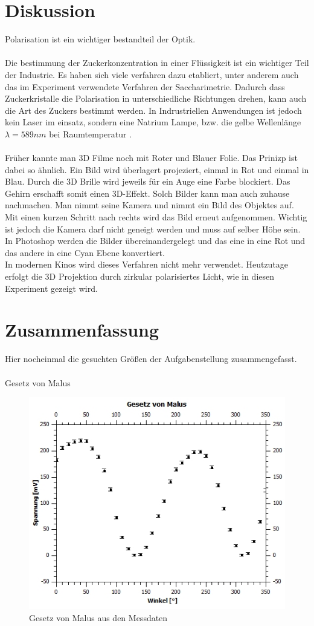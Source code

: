 \documentclass[12pt,a4paper,twoside]{article}
\begin{document}
\section{Diskussion} %
Polarisation ist ein wichtiger bestandteil der Optik. \\
\\
Die bestimmung der Zuckerkonzentration in einer Flüssigkeit ist ein wichtiger Teil der Industrie. Es haben sich viele verfahren dazu etabliert, unter anderem auch das im Experiment verwendete Verfahren der Saccharimetrie. 
Dadurch dass Zuckerkristalle die Polarisation in unterschiedliche Richtungen drehen, kann auch die Art des Zuckers bestimmt werden. 
In Indrustriellen Anwendungen ist jedoch kein Laser im einsatz, sondern eine Natrium Lampe, bzw. die gelbe Wellenlänge $\lambda = 589 nm$ bei Raumtemperatur \cite{wikisacc}. 
\\
\\
Früher kannte man 3D Filme noch mit Roter und Blauer Folie. Das Prinizp ist dabei so ähnlich. Ein Bild wird überlagert projeziert, einmal in Rot und einmal in Blau. Durch die 3D Brille wird jeweils für ein Auge eine Farbe blockiert. Das Gehirn erschafft somit einen 3D-Effekt. 
Solch Bilder kann man auch zuhause nachmachen. Man nimmt seine Kamera und nimmt ein Bild des Objektes auf. Mit einen kurzen Schritt nach rechts wird das Bild erneut aufgenommen. Wichtig ist jedoch die Kamera darf nicht geneigt werden und muss auf selber Höhe sein. 
In Photoshop werden die Bilder übereinandergelegt und das eine in eine Rot und das andere in eine Cyan Ebene konvertiert. 
\\
In modernen Kinos wird dieses Verfahren nicht mehr verwendet. Heutzutage erfolgt die 3D Projektion durch zirkular polarisiertes Licht, wie in diesen Experiment gezeigt wird. 

\section{Zusammenfassung} %
Hier nocheinmal die gesuchten Größen der Aufgabenstellung zusammengefasst. 
\\
\\
Gesetz von Malus
\begin{figure}[H]
    \centering
    \includegraphics[width=0.6\linewidth]{nudes/malusplot.jpg}
    \caption{Gesetz von Malus aus den Messdaten}
    \label{fig:malus beweis zus}
\end{figure}
\end{document}
